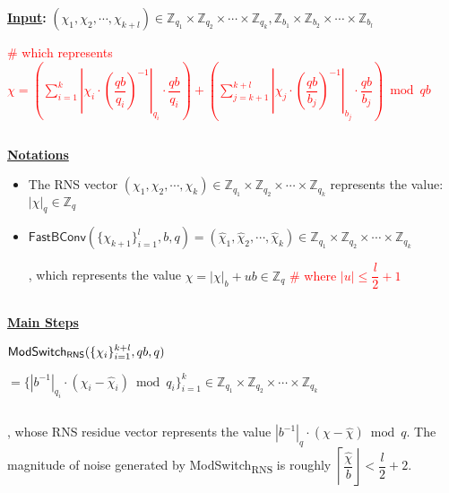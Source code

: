 \begin{tcolorbox}[title={\textbf{\tboxlabel{\ref*{subsec:rns-modswitch}} \textsf{ModSwitch\textsubscript{RNS}}}}]


\textbf{\underline{Input}:} $(\chi_1, \chi_2, \cdots, \chi_{k+l}) \in \mathbb{Z}_{q_1} \times \mathbb{Z}_{q_2} \times \cdots \times \mathbb{Z}_{q_k}, \mathbb{Z}_{b_1} \times \mathbb{Z}_{b_2} \times \cdots \times \mathbb{Z}_{b_l} $ 

\textcolor{red}{ \# which represents $\chi = \left(\sum\limits_{i=1}^{k}\left|\chi_i\cdot\left(\dfrac{qb}{q_i}\right)^{-1}\right|_{q_i}\cdot\dfrac{qb}{q_i}\right) + \left(\sum\limits_{j=k+1}^{k+l}\left|\chi_j\cdot\left(\dfrac{qb}{b_j}\right)^{-1}\right|_{b_j}\cdot\dfrac{qb}{b_j}\right) \bmod qb$} 

$ $

\textbf{\underline{Notations}}

\begin{itemize}

\item The RNS vector $(\chi_{1}, \chi_{2}, \cdots, \chi_{k}) \in \mathbb{Z}_{q_1} \times \mathbb{Z}_{q_2} \times \cdots \times \mathbb{Z}_{q_k}$ represents the value: $|\chi|_q \in \mathbb{Z}_q$

\item $\textsf{FastBConv}(\{\chi_{k+1}\}_{i=1}^{l}, b, q) = (\hat{\chi}_1, \hat{\chi}_2, \cdots, \hat{\chi}_k) \in \mathbb{Z}_{q_1} \times \mathbb{Z}_{q_2} \times \cdots \times \mathbb{Z}_{q_k}$ 

, which represents the value $\hat{\chi} = |\chi|_b + ub \in \mathbb{Z}_q$ \textcolor{red}{ \# where $|u| \leq \dfrac{l}{2}+1$}

\end{itemize}

$ $


\textbf{\underline{Main Steps}}


$\textsf{ModSwitch\textsubscript{RNS}}(\{\chi_i\}_{i=1}^{k+l}, qb, q)$


$= \{|b^{-1}|_{q_i}\cdot (\chi_i - \hat{\chi}_i) \bmod q_i\}_{i=1}^{k} \in \mathbb{Z}_{q_1} \times \mathbb{Z}_{q_2} \times \cdots \times \mathbb{Z}_{q_k}$ 

$ $

, whose RNS residue vector represents the value $|b^{-1}|_{q} \cdot (\chi - \hat{\chi}) \bmod q$. The magnitude of noise generated by \textsf{ModSwitch\textsubscript{RNS}} is roughly $\left\lceil\dfrac{\hat{\chi}}{b}\right\rfloor < \dfrac{l}{2} + 2$.

\end{tcolorbox}

